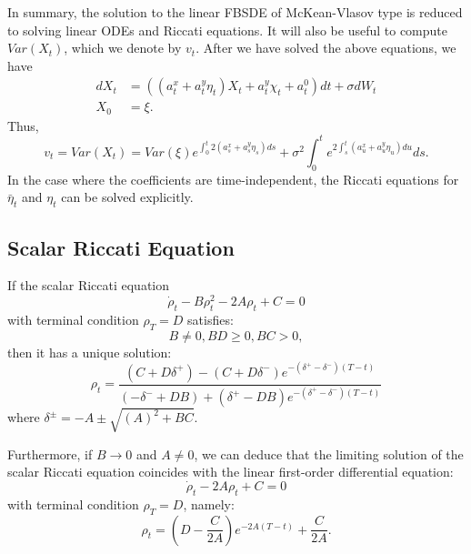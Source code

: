 \documentclass[11pt]{article}
\begin{document}
\begin{appendices}
In summary, the solution to the linear FBSDE of McKean-Vlasov type is reduced to solving linear ODEs and Riccati equations. It will also be useful to compute $Var(X_t)$, which we denote by $v_t$. After we have solved the above equations, we have
\begin{equation*}
\begin{split}
        dX_t&=\left((a^x_t+a^y_t \eta_t)X_t+a^y_t \chi_t+a^0_t\right)dt+\sigma dW_t \\
        X_0&=\xi.
\end{split}
\end{equation*}
Thus,
\begin{equation*}
    v_t=Var(X_t)=Var(\xi)e^{\int_0^t 2(a^x_s+a^y_s\eta_s)ds}+\sigma^2 \int_0^t e^{2 \int_s^t (a^x_u+a^y_u\eta_u) du}ds.
\end{equation*}
In the case where the coefficients are time-independent, the Riccati equations for $\bar{\eta}_t$ and $\eta_t$ can be solved explicitly.

\subsection*{\textbf{Scalar Riccati Equation}} If the scalar Riccati equation 
	\begin{equation*}
		\dot{\rho}_t - B \rho_t^2 - 2A \rho_t  + C = 0 
	\end{equation*}
	with terminal condition $\rho_T = D$ satisfies:
	\begin{equation}
		B \neq 0, BD \geq 0, BC>0,
	\label{eq:Riccati_assumptions}
	\end{equation}
	then it has a unique solution:
\begin{equation}
		\rho_t= \frac{(C+D \delta^+) - (C+D \delta^-) e^{-(\delta^+ - \delta^-)(T-t)}}{(-\delta^- + D B) + (\delta^+ - D B) e^{-(\delta^+ - \delta^-)(T-t)}}
	\label{eq:riccati_ut_sol_app}
\end{equation}
	where $\delta^\pm = -A \pm \sqrt{(A)^2 + B C}$.
	
	Furthermore, if $B \to 0$ and $A\neq 0$, we can deduce that the limiting solution of the scalar Riccati equation coincides with the linear first-order differential equation:
	\begin{equation*}
		\dot{\rho}_t - 2A \rho_t +C = 0 
	\end{equation*}
	with terminal condition $\rho_T = D$, namely:
	\begin{equation*}
		\rho_t = \left(D - \frac{C}{2A} \right) e^{-2A (T-t)} + \frac{C}{2A}.
	\end{equation*}
	

\end{appendices}
\end{document}
